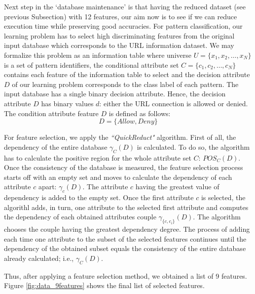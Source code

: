 \documentclass{llncs}
\begin{document}
Next step in the `database maintenance' is that having the reduced dataset (see previous Subsection) with 12 features, our aim now is to see if we can reduce execution time while preserving good accuracies. For pattern classification, our learning problem has to select high discriminating features from the original input database which corresponds to the URL information dataset. We may formalize this problem as an information table where universe $U = \{x_1, x_2, \ldots, x_N\}$ is a set of pattern identifiers, the conditional attribute set $C =\{c_1,c_2, \ldots, c_N\}$ contains each feature of the information table to select and the decision attribute $D$ of our learning problem corresponds to the class label of each pattern. The input database has a single binary decision attribute. Hence, the decision attribute $D$  has binary values $d$:  either the URL connection is allowed   or denied. The condition attribute feature $D$ is defined as follows:
\begin{displaymath}
D =\{Allow, Deny\}
\end{displaymath}

For feature selection, we apply the \emph{``QuickReduct"} algorithm. First of all, the dependency of the entire database $\gamma_{C}(D)$ is calculated. To do so, the algorithm has to calculate the positive region for the whole attribute set $C$: $POS_{C}(D)$. Once the consistency of the database is measured, the feature selection process starts off with an empty set and moves to calculate the dependency of each attribute $c$ apart: $\gamma_{c}(D)$. The attribute $c$ having the greatest value of dependency is added to the empty set. Once the first attribute $c$ is selected, the algorithl adds, in turn, one attribute to the selected first attribute and computes the dependency of each obtained attributes couple $\gamma_{\{c, c_{i}\}}(D)$. The algorithm chooses the couple having the greatest dependency degree. The process of adding each time one attribute to the subset of the selected features continues until the dependency of the obtained subset equals the consistency of the entire database already calculated; i.e., $\gamma_{C}(D)$. 

Thus, after applying a feature selection method, we obtained a list of 9 features. Figure \ref{fig:data_9features} shows the final list of selected features.
\end{document}
